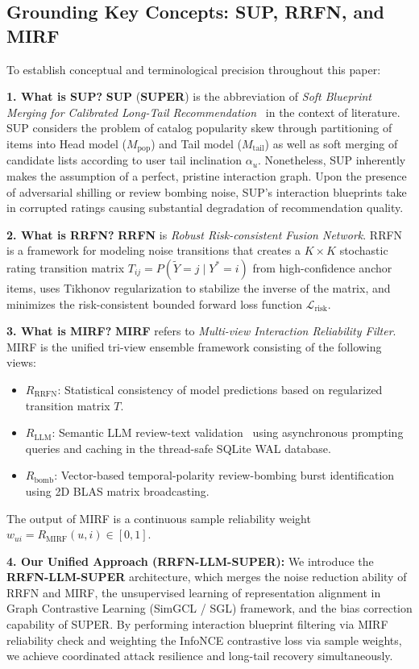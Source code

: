 \documentclass[10pt,journal]{IEEEtran}
\begin{document}
\subsection{Grounding Key Concepts: SUP, RRFN, and MIRF}
To establish conceptual and terminological precision throughout this paper:

\textbf{1. What is SUP?} \textbf{SUP} (\textbf{SUPER}) is the abbreviation of \textit{Soft Blueprint Merging for Calibrated Long-Tail Recommendation}~\cite{yang2022super} in the context of literature. SUP considers the problem of catalog popularity skew through partitioning of items into Head model ($M_{\text{pop}}$) and Tail model ($M_{\text{tail}}$) as well as soft merging of candidate lists according to user tail inclination $\alpha_u$. Nonetheless, SUP inherently makes the assumption of a perfect, pristine interaction graph. Upon the presence of adversarial shilling or review bombing noise, SUP's interaction blueprints take in corrupted ratings causing substantial degradation of recommendation quality.

\textbf{2. What is RRFN?} \textbf{RRFN} is \textit{Robust Risk-consistent Fusion Network}. RRFN is a framework for modeling noise transitions that creates a $K \times K$ stochastic rating transition matrix $T_{ij} = P(\tilde{Y} = j \mid Y^* = i)$ from high-confidence anchor items, uses Tikhonov regularization to stabilize the inverse of the matrix, and minimizes the risk-consistent bounded forward loss function $\mathcal{L}_{\text{risk}}$.

\textbf{3. What is MIRF?} \textbf{MIRF} refers to \textit{Multi-view Interaction Reliability Filter}. MIRF is the unified tri-view ensemble framework consisting of the following views:
\begin{itemize}
    \item $R_{\text{RRFN}}$: Statistical consistency of model predictions based on regularized transition matrix $T$.
    \item $R_{\text{LLM}}$: Semantic LLM review-text validation~\cite{fan2023recommender} using asynchronous prompting queries and caching in the thread-safe SQLite WAL database.
    \item $R_{\text{bomb}}$: Vector-based temporal-polarity review-bombing burst identification using 2D BLAS matrix broadcasting.
\end{itemize}
The output of MIRF is a continuous sample reliability weight $w_{ui} = R_{\text{MIRF}}(u, i) \in [0, 1]$.

\textbf{4. Our Unified Approach (RRFN-LLM-SUPER):} We introduce the \textbf{RRFN-LLM-SUPER} architecture, which merges the noise reduction ability of RRFN and MIRF, the unsupervised learning of representation alignment in Graph Contrastive Learning (SimGCL / SGL) framework, and the bias correction capability of SUPER. By performing interaction blueprint filtering via MIRF reliability check and weighting the InfoNCE contrastive loss via sample weights, we achieve coordinated attack resilience and long-tail recovery simultaneously.
\end{document}
